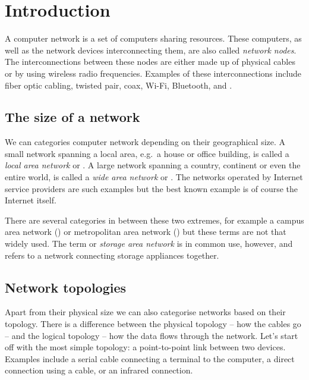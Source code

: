 \chapter{Introduction}

\begin{center}
\end{center}

A computer network is a set of computers sharing resources.
These computers, as well as the network devices interconnecting them, are also called \emph{network nodes}.
The interconnections between these nodes are either made up of physical cables or by using wireless radio frequencies.
Examples of these interconnections include fiber optic cabling, twisted pair, coax, Wi-Fi, Bluetooth, and .



\section{The size of a network}

We can categories computer network depending on their geographical size.
A small network spanning a local area, e.g.~a house or office building, is called a \emph{local area network} or .
A large network spanning a country, continent or even the entire world, is called a \emph{wide area network} or .
The networks operated by Internet service providers are such examples but the best known example is of course the Internet itself.

There are several categories in between these two extremes, for example a campus area network () or metropolitan area network () but these terms are not that widely used.
The term  or \emph{storage area network} is in common use, however, and refers to a network connecting storage appliances together.



\section{Network topologies}

Apart from their physical size we can also categorise networks based on their topology.
There is a difference between the physical topology -- how the cables go -- and the logical topology -- how the data flows through the network.
Let's start off with the most simple topology: a point-to-point link between two devices.
Examples include a serial cable connecting a terminal to the computer, a direct connection using a  cable, or an infrared connection.

